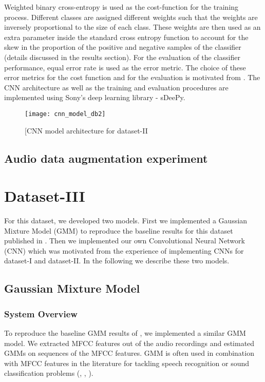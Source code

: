 Weighted binary cross-entropy is used as the cost-function for the training process. Different classes are assigned different weights such that the weights are inversely proportional to the size of each class. These weights are then used as an extra parameter inside the standard cross entropy function to account for the skew in the proportion of the positive and negative samples of the classifier (details discussed in the results section). For the evaluation of the classifier performance, equal error rate is used as the error metric. The choice of these error metrics for the cost function and for the evaluation is motivated from \cite{kons2013audio}. The CNN architecture as well as the training and evaluation procedures are implemented using Sony's deep learning library - sDeePy.

\begin{figure}[!htb] 
\centering 
\texttt{[image: cnn\_model\_db2]}
\caption[CNN model architecture for dataset-II]{[CNN model architecture for dataset-II}
\label{fig:cnn_model_db2} 
\end{figure}

\subsection{Audio data augmentation experiment}


\section{Dataset-III}
For this dataset, we developed two models. First we implemented a Gaussian Mixture Model (GMM) to reproduce the baseline results for this dataset published in \cite{foster2015chime}. Then we implemented our own Convolutional Neural Network (CNN) which was motivated from the experience of implementing CNNs for dataset-I and dataset-II. In the following we describe these two models.

\subsection{Gaussian Mixture Model}

\subsubsection{System Overview}
To reproduce the baseline GMM results of \cite{foster2015chime}, we implemented a similar GMM model. We extracted MFCC features out of the audio recordings and estimated GMMs on sequences of the MFCC features. GMM is often used in combination with MFCC features in the literature for tackling speech recognition or sound classification problems (\cite{stowelldetection}, \cite{defreville2006automatic}, \cite{aucouturier2007bag}).

